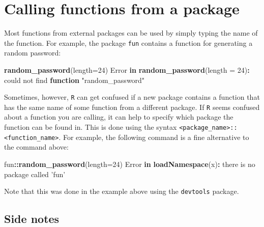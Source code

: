 \documentclass[]{book}
\newenvironment{Shaded}{\begin{snugshade}}{\end{snugshade}}
\newcommand{\ControlFlowTok}[1]{\textcolor[rgb]{0.13,0.29,0.53}{\textbf{#1}}}
\newcommand{\DataTypeTok}[1]{\textcolor[rgb]{0.13,0.29,0.53}{#1}}
\newcommand{\DecValTok}[1]{\textcolor[rgb]{0.00,0.00,0.81}{#1}}
\newcommand{\KeywordTok}[1]{\textcolor[rgb]{0.13,0.29,0.53}{\textbf{#1}}}
\newcommand{\NormalTok}[1]{#1}
\newcommand{\OperatorTok}[1]{\textcolor[rgb]{0.81,0.36,0.00}{\textbf{#1}}}
\newcommand{\StringTok}[1]{\textcolor[rgb]{0.31,0.60,0.02}{#1}}
\begin{document}
\hypertarget{calling-functions-from-a-package}{%
\section*{Calling functions from a package}\label{calling-functions-from-a-package}}

Most functions from external packages can be used by simply typing the name of the function. For example, the package \texttt{fun} contains a function for generating a random password:

\begin{Shaded}
\begin{Highlighting}[]
\KeywordTok{random_password}\NormalTok{(}\DataTypeTok{length=}\DecValTok{24}\NormalTok{)}
\NormalTok{Error }\ControlFlowTok{in} \KeywordTok{random_password}\NormalTok{(}\DataTypeTok{length =} \DecValTok{24}\NormalTok{)}\OperatorTok{:}\StringTok{ }\NormalTok{could not find }\ControlFlowTok{function} \StringTok{"random_password"}
\end{Highlighting}
\end{Shaded}

Sometimes, however, \texttt{R} can get confused if a new package contains a function that has the same name of some function from a different package. If \texttt{R} seems confused about a function you are calling, it can help to specify which package the function can be found in. This is done using the syntax \texttt{\textless{}package\_name\textgreater{}::\textless{}function\_name\textgreater{}}. For example, the following command is a fine alternative to the command above:

\begin{Shaded}
\begin{Highlighting}[]
\NormalTok{fun}\OperatorTok{::}\KeywordTok{random_password}\NormalTok{(}\DataTypeTok{length=}\DecValTok{24}\NormalTok{)}
\NormalTok{Error }\ControlFlowTok{in} \KeywordTok{loadNamespace}\NormalTok{(x)}\OperatorTok{:}\StringTok{ }\NormalTok{there is no package called }\StringTok{'fun'}
\end{Highlighting}
\end{Shaded}

Note that this was done in the example above using the \texttt{devtools} package.

\hypertarget{side-notes}{%
\subsection*{Side notes}\label{side-notes}}
\end{document}
